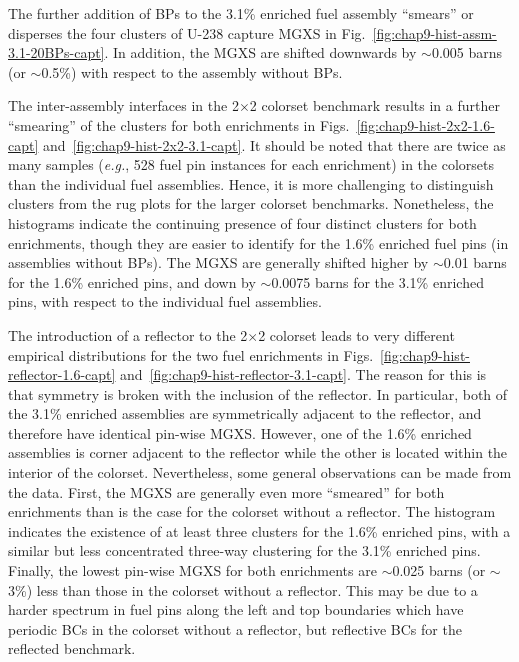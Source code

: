 \noindent The further addition of \acp{BP} to the 3.1\% enriched fuel assembly ``smears'' or disperses the four clusters of U-238 capture \ac{MGXS} in Fig.~\ref{fig:chap9-hist-assm-3.1-20BPs-capt}. In addition, the \ac{MGXS} are shifted downwards by $\sim$0.005 barns (or $\sim$0.5\%) with respect to the assembly without \acp{BP}.

The inter-assembly interfaces in the 2$\times$2 colorset benchmark results in a further ``smearing'' of the clusters for both enrichments in Figs.~\ref{fig:chap9-hist-2x2-1.6-capt} and~\ref{fig:chap9-hist-2x2-3.1-capt}. It should be noted that there are twice as many samples (\textit{e.g.}, 528 fuel pin instances for each enrichment) in the colorsets than the individual fuel assemblies. Hence, it is more challenging to distinguish clusters from the rug plots for the larger colorset benchmarks. Nonetheless, the histograms indicate the continuing presence of four distinct clusters for both enrichments, though they are easier to identify for the 1.6\% enriched fuel pins (in assemblies without \acp{BP}). The \ac{MGXS} are generally shifted higher by $\sim$0.01 barns for the 1.6\% enriched pins, and down by $\sim$0.0075 barns for the 3.1\% enriched pins, with respect to the individual fuel assemblies.

The introduction of a reflector to the 2$\times$2 colorset leads to very different empirical distributions for the two fuel enrichments in Figs.~\ref{fig:chap9-hist-reflector-1.6-capt} and~\ref{fig:chap9-hist-reflector-3.1-capt}. The reason for this is that symmetry is broken with the inclusion of the reflector. In particular, both of the 3.1\% enriched assemblies are symmetrically adjacent to the reflector, and therefore have identical pin-wise \ac{MGXS}. However, one of the 1.6\% enriched assemblies is corner adjacent to the reflector while the other is located within the interior of the colorset. Nevertheless, some general observations can be made from the data. First, the \ac{MGXS} are generally even more ``smeared'' for both enrichments than is the case for the colorset without a reflector. The histogram indicates the existence of at least three clusters for the 1.6\% enriched pins, with a similar but less concentrated three-way clustering for the 3.1\% enriched pins. Finally, the lowest pin-wise \ac{MGXS} for both enrichments are $\sim$0.025 barns (or $\sim$3\%) less than those in the colorset without a reflector. This may be due to a harder spectrum in fuel pins along the left and top boundaries which have periodic \acp{BC} in the colorset without a reflector, but reflective \acp{BC} for the reflected benchmark.

